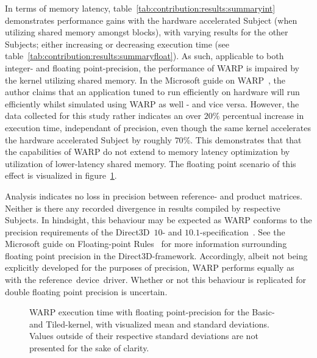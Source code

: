 In terms of memory latency, table~\ref{tab:contribution:results:summaryint} demonstrates performance gains with the hardware accelerated Subject (when utilizing shared memory amongst blocks), with varying results for the other Subjects; either increasing or decreasing execution time (see table~\ref{tab:contribution:results:summaryfloat}).
As such, applicable to both integer- and floating point-precision, the performance of WARP is impaired by the kernel utilizing shared memory.
In the Microsoft guide on WARP~, the author claims that an application tuned to run efficiently on hardware will run efficiently whilst simulated using WARP as well - and vice versa.
However, the data collected for this study rather indicates an over $20\%$ percentual increase in execution time, independant of precision, even though the same kernel accelerates the hardware accelerated Subject by roughly $70$\%.
This demonstrates that that the capabilities of WARP do not extend to memory latency optimization by utilization of lower-latency shared memory.
The floating point scenario of this effect is visualized in figure~\ref{fig:contribution:results:warp:msswarp}.

Analysis indicates no loss in precision between reference- and product matrices.
Neither is there any recorded divergence in results compiled by respective Subjects.
In hindsight, this behaviour may be expected as WARP conforms to the precision requirements of the Direct3D~$10$- and $10.1$-specification~.
See the Microsoft guide on Floating-point Rules~ for more information surrounding floating point precision in the Direct3D-framework.
Accordingly, albeit not being explicitly developed for the purposes of precision, WARP performs equally as with the reference~device~driver.
Whether or not this behaviour is replicated for double floating point precision is uncertain.

\begin{figure}[htb]
\begin{center}
	\resizebox{ \columnwidth }{!}{}
	\caption{WARP execution time with floating point-precision for the Basic- and Tiled-kernel, with visualized mean and standard deviations. Values outside of their respective standard deviations are not presented for the sake of clarity.}
	\label{fig:contribution:results:warp:msswarp}
\end{center}
\end{figure}
